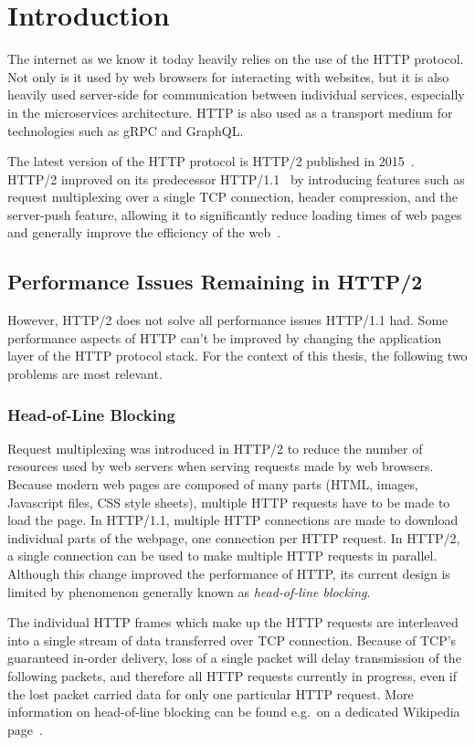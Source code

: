 \chapter{Introduction}

The internet as we know it today heavily relies on the use of the HTTP protocol. Not only is it used
by web browsers for interacting with websites, but it is also heavily used server-side for
communication between individual services, especially in the microservices architecture. HTTP is
also used as a transport medium for technologies such as gRPC and GraphQL\@.

The latest version of the HTTP protocol is HTTP/2 published in 2015~\cite{rfc7540}. HTTP/2
improved on its predecessor HTTP/1.1~\cite{rfc7230} by introducing features such as request
multiplexing over a single TCP connection, header compression, and the server-push feature, allowing
it to significantly reduce loading times of web pages and generally improve the efficiency of the
web~\cite{deSaxce2015}.

\section{Performance Issues Remaining in HTTP/2}

However, HTTP/2 does not solve all performance issues HTTP/1.1 had. Some performance aspects of HTTP
can't be improved by changing the application layer of the HTTP protocol stack. For the context of
this thesis, the following two problems are most relevant.

\subsection*{Head-of-Line Blocking}

Request multiplexing was introduced in HTTP/2 to reduce the number of resources used by web servers
when serving requests made by web browsers. Because modern web pages are composed of many parts
(HTML, images, Javascript files, CSS style sheets), multiple HTTP requests have to be made to load
the page. In HTTP/1.1, multiple HTTP connections are made to download individual parts of the
webpage, one connection per HTTP request. In HTTP/2, a single connection can be used to make
multiple HTTP requests in parallel. Although this change improved the performance of HTTP, its
current design is limited by phenomenon generally known as \textit{head-of-line blocking}.

The individual HTTP frames which make up the HTTP requests are interleaved into a single stream of
data transferred over TCP connection. Because of TCP's guaranteed in-order delivery, loss of a
single packet will delay transmission of the following packets, and therefore all HTTP requests
currently in progress, even if the lost packet carried data for only one particular HTTP request.
More information on head-of-line blocking can be found e.g.\ on a dedicated Wikipedia
page~\cite{wiki:head-of-line_blocking}.

